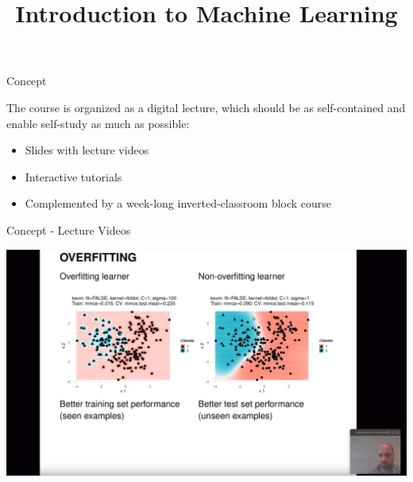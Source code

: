 \documentclass[10pt]{beamer}
\title{Introduction to Machine Learning}
\begin{document}
\maketitle

\begin{frame}{Concept}

The course is organized as a digital lecture, which should be as self-contained and enable self-study as much as possible:

  \begin{itemize}
    \item
      Slides with lecture videos

    \item
      Interactive tutorials

    \item
       Complemented by a week-long inverted-classroom block course

  \end{itemize}

\end{frame}

\begin{frame}{Concept - Lecture Videos}

  \begin{center}
  \includegraphics[width=\textwidth]{figures/iml_video.png}
  \end{center}

\end{frame}
\end{document}
